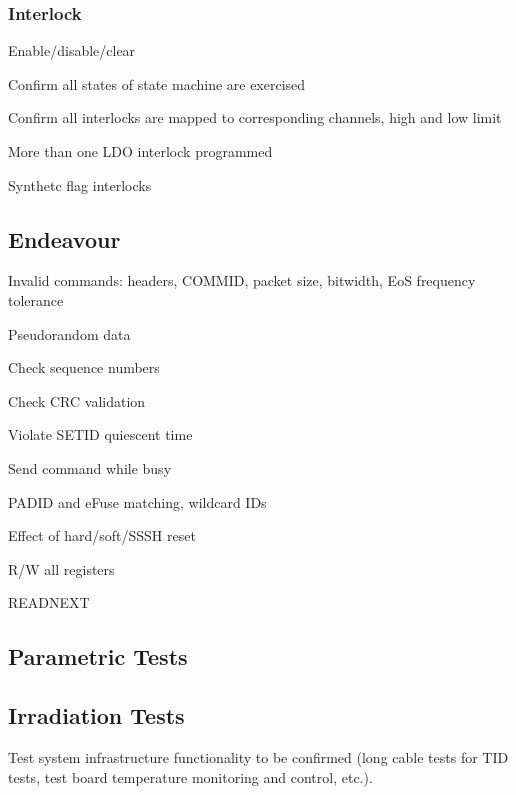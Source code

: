 \documentclass[11pt]{article}   			%
\begin{document}
\subsubsection{Interlock}
\begin{compactitem}
    \item{Enable/disable/clear}
    \item{Confirm all states of state machine are exercised}
    \item{Confirm all interlocks are mapped to corresponding channels, high and low limit}
	\item{More than one LDO interlock programmed}
	\item{Synthetc flag interlocks}
\end{compactitem}
 
\subsection{Endeavour}
\begin{compactitem}
    \item{Invalid commands: headers, COMMID, packet size, bitwidth, EoS frequency tolerance}
    \item{Pseudorandom data}
    \item{Check sequence numbers}
    \item{Check CRC validation}
    \item{Violate SETID quiescent time}
    \item{Send command while busy}
    \item{PADID and eFuse matching, wildcard IDs}
    \item{Effect of hard/soft/SSSH reset}
    \item{R/W all registers}
    \item{READNEXT}
\end{compactitem}
 
\subsection{Parametric Tests}
 
\subsection{Irradiation Tests}
Test system infrastructure functionality to be confirmed (long cable tests for TID tests, 
test board temperature monitoring and control, etc.).
\end{document}
